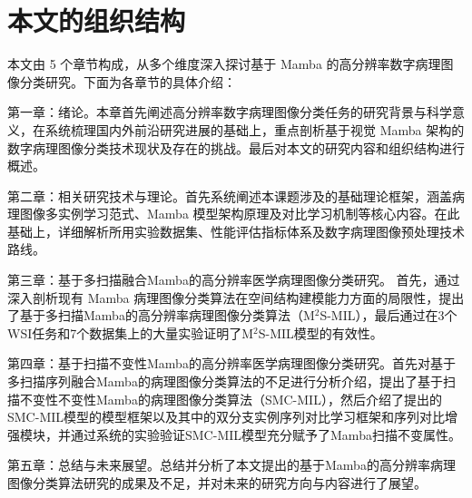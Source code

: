 \section[\hspace{-2pt}本文组织结构]{{\heiti{} \hspace{-8pt}本文的组织结构}}\label{section1: 本文组织结构}

本文由 5 个章节构成，从多个维度深入探讨基于 Mamba 的高分辨率数字病理图像分类研究。下面为各章节的具体介绍：

第一章：绪论。本章首先阐述高分辨率数字病理图像分类任务的研究背景与科学意义，在系统梳理国内外前沿研究进展的基础上，重点剖析基于视觉 Mamba 架构的数字病理图像分类技术现状及存在的挑战。最后对本文的研究内容和组织结构进行概述。

第二章：相关研究技术与理论。首先系统阐述本课题涉及的基础理论框架，涵盖病理图像多实例学习范式、Mamba 模型架构原理及对比学习机制等核心内容。在此基础上，详细解析所用实验数据集、性能评估指标体系及数字病理图像预处理技术路线。

第三章：基于多扫描融合Mamba的高分辨率医学病理图像分类研究。
首先，通过深入剖析现有 Mamba 病理图像分类算法在空间结构建模能力方面的局限性，提出了基于多扫描Mamba的高分辨率病理图像分类算法（M$^2$S-MIL），最后通过在3个WSI任务和7个数据集上的大量实验证明了M$^2$S-MIL模型的有效性。

第四章：基于扫描不变性Mamba的高分辨率医学病理图像分类研究。首先对基于多扫描序列融合Mamba的病理图像分类算法的不足进行分析介绍，提出了基于扫描不变性不变性Mamba的病理图像分类算法（SMC-MIL），然后介绍了提出的SMC-MIL模型的模型框架以及其中的双分支实例序列对比学习框架和序列对比增强模块，并通过系统的实验验证SMC-MIL模型充分赋予了Mamba扫描不变属性。

第五章：总结与未来展望。总结并分析了本文提出的基于Mamba的高分辨率病理图像分类算法研究的成果及不足，并对未来的研究方向与内容进行了展望。

